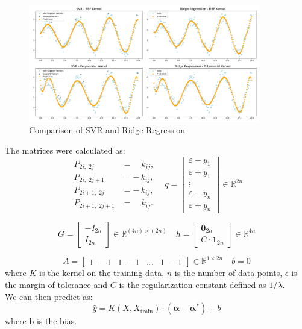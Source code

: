 \documentclass[9pt]{IEEEtran}
\begin{document}
\vspace{10pt}
\begin{figure}[H]
    \centering
    \includegraphics[width=0.9\textwidth]{figures/part1.png}
    \caption{Comparison of SVR and Ridge Regression}
    \label{fig:part1}
\end{figure}


The matrices were calculated as: 
\[
\begin{aligned}
P_{2i,\;2j}   &=\quad k_{ij},\\
P_{2i,\;2j+1} &= -\,k_{ij},\\
P_{2i+1,\;2j} &= -\,k_{ij},\\
P_{2i+1,\;2j+1} &=\quad k_{ij}.
\end{aligned}
\hspace{10pt}
q = 
\begin{bmatrix}
\varepsilon - y_1 \\ 
\varepsilon + y_1 \\ 
\vdots \\ 
\varepsilon - y_n \\ 
\varepsilon + y_n 
\end{bmatrix}
\in \mathbb{R}^{2n}
\]

\[
G = 
\begin{bmatrix}
 -I_{2n} \\ 
 I_{2n}
\end{bmatrix}
\in \mathbb{R}^{(4n) \times (2n)}
\quad
h = 
\begin{bmatrix}
 \mathbf{0}_{2n} \\ 
 C \cdot \mathbf{1}_{2n}
\end{bmatrix}
\in \mathbb{R}^{4n}
\]

\[
A = 
\begin{bmatrix}
 1 & -1 & 1 & -1 & \dots & 1 & -1
\end{bmatrix}
\in \mathbb{R}^{1 \times 2n}
\quad
b = 0
\]
where $K$ is the kernel on the training data, $n$ is the number of data points, 
$\epsilon$ is the margin of tolerance and $C$ is the regularization constant defined 
as $1/\lambda$.\\
We can then predict as: 
\[
\hat{y} = K(X, X_{\text{train}}) \cdot (\boldsymbol{\alpha} - \boldsymbol{\alpha}^*) + b
\]
where b is the bias.
\end{document}
